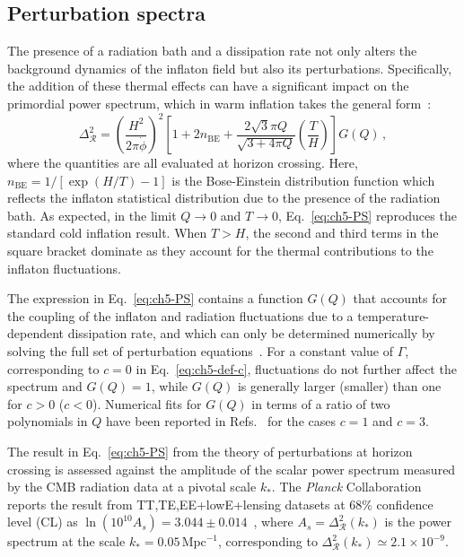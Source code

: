 \subsection{Perturbation spectra}

The presence of a radiation bath and a dissipation rate not only alters the background dynamics of the inflaton field but also its perturbations. Specifically, the addition of these thermal effects can have a significant impact on the primordial power spectrum, which in warm inflation takes the general form~\cite{Hall:2003zp, Graham:2009bf, Bastero-Gil:2011rva, Ramos:2013nsa}:
\begin{equation}
    \label{eq:ch5-PS}
    \Delta_{\mathcal{R}}^{2}=\left(\frac{H^{2}}{2 \pi \dot{\phi}}\right)^{2}\left[1+2 n_{\mathrm{BE}}+\frac{2 \sqrt{3} \pi Q}{\sqrt{3+4 \pi Q}} \left(\frac{T}{H}\right)\right] G(Q)\,,
\end{equation}
where the quantities are all evaluated at horizon crossing. Here, $n_{\mathrm{BE}} =1/\left[\exp(H/T)-1\right]$ is the Bose-Einstein distribution function which reflects the inflaton statistical distribution due to the presence of the radiation bath. As expected, in the limit $Q \to 0$ and $T \to 0$, Eq.~\ref{eq:ch5-PS} reproduces the standard cold inflation result. When $T>H$, the second and third terms in the square bracket dominate as they account for the thermal contributions to the inflaton fluctuations.

The expression in Eq.~\ref{eq:ch5-PS} contains a function $G(Q)$ that accounts for the coupling of the inflaton and radiation fluctuations due to a temperature-dependent dissipation rate, and which can only be determined numerically by solving the full set of perturbation equations~\cite{Graham:2009bf, Bastero-Gil:2011rva}. For a constant value of $\Gamma$, corresponding to $c=0$ in Eq.~\ref{eq:ch5-def-c}, fluctuations do not further affect the spectrum and $G(Q) = 1$, while $G(Q)$ is generally larger (smaller) than one for $c >0$ ($c<0$). Numerical fits for $G(Q)$ in terms of a ratio of two polynomials in $Q$ have been reported in Refs.~\cite{Bastero-Gil:2016qru, Benetti:2016jhf} for the cases $c = 1$ and $c=3$.

The result in Eq.~\ref{eq:ch5-PS} from the theory of perturbations at horizon crossing is assessed against the amplitude of the scalar power spectrum measured by the CMB radiation data at a pivotal scale $k_*$. The \textit{Planck} Collaboration reports the result from TT,TE,EE+lowE+lensing datasets at 68\% confidence level (CL) as $\ln(10^{10}A_s) = 3.044\pm 0.014$~\cite{Planck:2018vyg}, where $A_s = \Delta_{\mathcal{R}}^2(k_{*})$ is the power spectrum at the scale $k_{*} = 0.05\,\mathrm{Mpc}^{-1}$, corresponding to $\Delta_{\mathcal{R}}^2(k_{*}) \simeq 2.1 \times 10^{-9}$.

